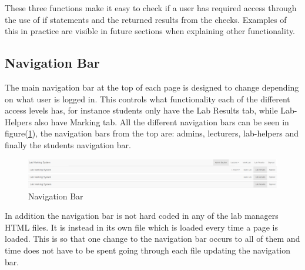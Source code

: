 \documentclass[11pt]{report}
\begin{document}



These three functions make it easy to check if a user has required access through the use of if statements and the returned results from the checks. Examples of this in practice are visible in future sections when explaining other functionality. 


\subsection{Navigation Bar}

The main navigation bar at the top of each page is designed to change depending on what user is logged in. This controls what functionality each of the different access levels has, for instance students only have the Lab Results tab, while Lab-Helpers also have Marking tab. All the different navigation bars can be seen in figure(\ref{fig:nav-all}), the navigation bars from the top are: admins, lecturers, lab-helpers and finally the students navigation bar.  

\begin{figure}[H]
    \centering
    \includegraphics[width=1\textwidth]{images/implementation/nav-all.png}
    \caption{Navigation Bar}
    \label{fig:nav-all}
\end{figure}

\noindent In addition the navigation bar is not hard coded in any of the lab managers HTML files. It is instead in its own file which is loaded every time a page is loaded. This is so that one change to the navigation bar occurs to all of them and time does not have to be spent going through each file updating the navigation bar.
\end{document}

